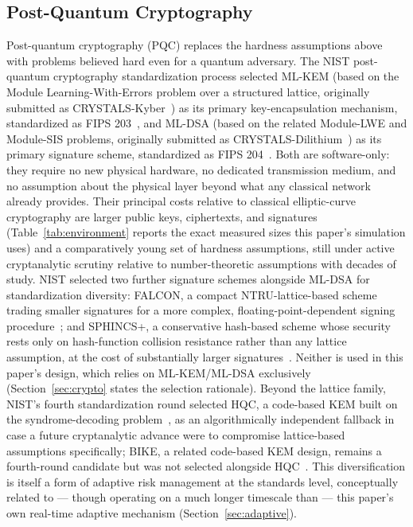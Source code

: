 \documentclass[journal]{IEEEtran}
\begin{document}
\subsection{Post-Quantum Cryptography}

Post-quantum cryptography (PQC) replaces the hardness assumptions above with problems believed hard even for a quantum adversary. The NIST post-quantum cryptography standardization process selected ML-KEM (based on the Module Learning-With-Errors problem over a structured lattice, originally submitted as CRYSTALS-Kyber~\cite{bos2018kyber}) as its primary key-encapsulation mechanism, standardized as FIPS 203~\cite{nist2024fips203}, and ML-DSA (based on the related Module-LWE and Module-SIS problems, originally submitted as CRYSTALS-Dilithium~\cite{ducas2018dilithium}) as its primary signature scheme, standardized as FIPS 204~\cite{nist2024fips204}. Both are software-only: they require no new physical hardware, no dedicated transmission medium, and no assumption about the physical layer beyond what any classical network already provides. Their principal costs relative to classical elliptic-curve cryptography are larger public keys, ciphertexts, and signatures (Table~\ref{tab:environment} reports the exact measured sizes this paper's simulation uses) and a comparatively young set of hardness assumptions, still under active cryptanalytic scrutiny relative to number-theoretic assumptions with decades of study. NIST selected two further signature schemes alongside ML-DSA for standardization diversity: FALCON, a compact NTRU-lattice-based scheme trading smaller signatures for a more complex, floating-point-dependent signing procedure~\cite{fouque2020falcon}; and SPHINCS+, a conservative hash-based scheme whose security rests only on hash-function collision resistance rather than any lattice assumption, at the cost of substantially larger signatures~\cite{bernstein2019sphincsplus}. Neither is used in this paper's design, which relies on ML-KEM/ML-DSA exclusively (Section~\ref{sec:crypto} states the selection rationale). Beyond the lattice family, NIST's fourth standardization round selected HQC, a code-based KEM built on the syndrome-decoding problem~\cite{aguilarmelchor2018hqc}, as an algorithmically independent fallback in case a future cryptanalytic advance were to compromise lattice-based assumptions specifically; BIKE, a related code-based KEM design, remains a fourth-round candidate but was not selected alongside HQC~\cite{bikesuite2024spec,nist2025pqcround4status}. This diversification is itself a form of adaptive risk management at the standards level, conceptually related to --- though operating on a much longer timescale than --- this paper's own real-time adaptive mechanism (Section~\ref{sec:adaptive}).
\end{document}
